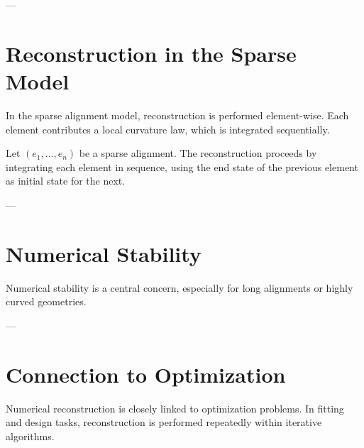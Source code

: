

---

\section{Reconstruction in the Sparse Model}

\begin{remark}
In the sparse alignment model, reconstruction is performed element-wise.
Each element contributes a local curvature law, which is integrated
sequentially.
\end{remark}

\begin{definition}
Let $(e_1,\dots,e_n)$ be a sparse alignment. The reconstruction proceeds
by integrating each element in sequence, using the end state of the
previous element as initial state for the next.
\end{definition}


---

\section{Numerical Stability}

\begin{remark}
Numerical stability is a central concern, especially for long alignments
or highly curved geometries.
\end{remark}



---

\section{Connection to Optimization}

\begin{remark}
Numerical reconstruction is closely linked to optimization problems.
In fitting and design tasks, reconstruction is performed repeatedly
within iterative algorithms.
\end{remark}

